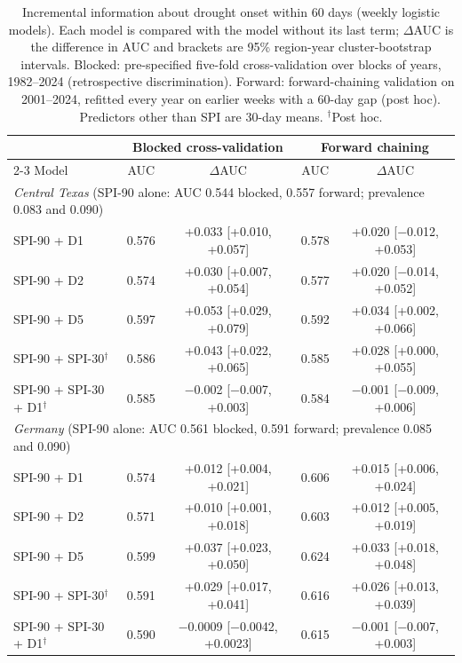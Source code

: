 \begin{table}[tbp]
\caption{Incremental information about drought onset within 60 days (weekly logistic models). Each model
is compared with the model without its last term; $\Delta$AUC is the difference in AUC and brackets are
95\% region-year cluster-bootstrap intervals. Blocked: pre-specified five-fold cross-validation over
blocks of years, 1982--2024 (retrospective discrimination). Forward: forward-chaining validation on
2001--2024, refitted every year on earlier weeks with a 60-day gap (post hoc). Predictors other than SPI
are 30-day means. $^{\dagger}$Post hoc.}
\label{tab:incremental}
\footnotesize\setlength{\tabcolsep}{3pt}
\begin{tabular*}{\textwidth}{@{\extracolsep\fill}lcccc}
\toprule
& \multicolumn{2}{c}{Blocked cross-validation} & \multicolumn{2}{c}{Forward chaining}\\
\cmidrule{2-3}\cmidrule{4-5}
Model & AUC & $\Delta$AUC & AUC & $\Delta$AUC\\
\midrule
\multicolumn{5}{l}{\textit{Central Texas} (SPI-90 alone: AUC 0.544 blocked, 0.557 forward; prevalence 0.083 and 0.090)}\\
\quad SPI-90 + D1 & 0.576 & +0.033 [+0.010, +0.057] & 0.578 & +0.020 [$-$0.012, +0.053] \\
\quad SPI-90 + D2 & 0.574 & +0.030 [+0.007, +0.054] & 0.577 & +0.020 [$-$0.014, +0.052] \\
\quad SPI-90 + D5 & 0.597 & +0.053 [+0.029, +0.079] & 0.592 & +0.034 [+0.002, +0.066] \\
\quad SPI-90 + SPI-30$^{\dagger}$ & 0.586 & +0.043 [+0.022, +0.065] & 0.585 & +0.028 [+0.000, +0.055] \\
\quad SPI-90 + SPI-30 + D1$^{\dagger}$ & 0.585 & $-$0.002 [$-$0.007, +0.003] & 0.584 & $-$0.001 [$-$0.009, +0.006] \\
\midrule
\multicolumn{5}{l}{\textit{Germany} (SPI-90 alone: AUC 0.561 blocked, 0.591 forward; prevalence 0.085 and 0.090)}\\
\quad SPI-90 + D1 & 0.574 & +0.012 [+0.004, +0.021] & 0.606 & +0.015 [+0.006, +0.024] \\
\quad SPI-90 + D2 & 0.571 & +0.010 [+0.001, +0.018] & 0.603 & +0.012 [+0.005, +0.019] \\
\quad SPI-90 + D5 & 0.599 & +0.037 [+0.023, +0.050] & 0.624 & +0.033 [+0.018, +0.048] \\
\quad SPI-90 + SPI-30$^{\dagger}$ & 0.591 & +0.029 [+0.017, +0.041] & 0.616 & +0.026 [+0.013, +0.039] \\
\quad SPI-90 + SPI-30 + D1$^{\dagger}$ & 0.590 & $-$0.0009 [$-$0.0042, +0.0023] & 0.615 & $-$0.001 [$-$0.007, +0.003] \\

\end{tabular*}
\end{table}
